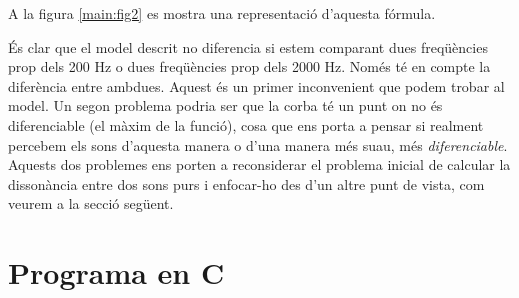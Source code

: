 \documentclass{article}
\theoremstyle{math}
\newcommand{\0}{\ensuremath{\vb{0}}}
\begin{document}
A la figura \ref{main:fig2} es mostra una representació d'aquesta fórmula.
\begin{center}
    
    \label{main:fig2}
\end{center}
És clar que el model descrit no diferencia si estem comparant dues freqüències prop dels 200 Hz o dues freqüències prop dels 2000 Hz. Només té en compte la diferència entre ambdues. Aquest és un primer inconvenient que podem trobar al model. Un segon problema podria ser que la corba té un punt on no és diferenciable (el màxim de la funció), cosa que ens porta a pensar si realment percebem els sons d'aquesta manera o d'una manera més suau, més \textit{diferenciable}. Aquests dos problemes ens porten a reconsiderar el problema inicial de calcular la dissonància entre dos sons purs i enfocar-ho des d'un altre punt de vista, com veurem a la secció següent.
\section{Programa en C}\label{appendix1}
%
\end{document}
